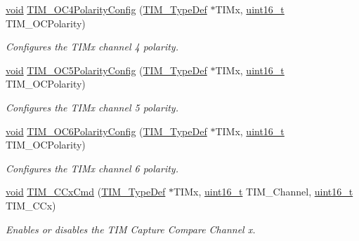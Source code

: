 \begin{DoxyCompactItemize}
\hyperlink{group___n_a_m_e_ga18028b8badbf1ea7e704ccac3c488e82}{void} \hyperlink{group___t_i_m___group2_gad678410f7c7244f83daad93ce9d1056e}{T\-I\-M\-\_\-\-O\-C4\-Polarity\-Config} (\hyperlink{struct_t_i_m___type_def}{T\-I\-M\-\_\-\-Type\-Def} $\ast$T\-I\-Mx, \hyperlink{stdint_8h_a273cf69d639a59973b6019625df33e30}{uint16\-\_\-t} T\-I\-M\-\_\-\-O\-C\-Polarity)
\begin{DoxyCompactList}\small\item\em Configures the T\-I\-Mx channel 4 polarity. \end{DoxyCompactList}\item 
\hyperlink{group___n_a_m_e_ga18028b8badbf1ea7e704ccac3c488e82}{void} \hyperlink{group___t_i_m___group2_ga9892494ca12fffef20b2e95970d7ef66}{T\-I\-M\-\_\-\-O\-C5\-Polarity\-Config} (\hyperlink{struct_t_i_m___type_def}{T\-I\-M\-\_\-\-Type\-Def} $\ast$T\-I\-Mx, \hyperlink{stdint_8h_a273cf69d639a59973b6019625df33e30}{uint16\-\_\-t} T\-I\-M\-\_\-\-O\-C\-Polarity)
\begin{DoxyCompactList}\small\item\em Configures the T\-I\-Mx channel 5 polarity. \end{DoxyCompactList}\item 
\hyperlink{group___n_a_m_e_ga18028b8badbf1ea7e704ccac3c488e82}{void} \hyperlink{group___t_i_m___group2_ga9f1dda56b1fb8f7ac17b9a7f58d0232d}{T\-I\-M\-\_\-\-O\-C6\-Polarity\-Config} (\hyperlink{struct_t_i_m___type_def}{T\-I\-M\-\_\-\-Type\-Def} $\ast$T\-I\-Mx, \hyperlink{stdint_8h_a273cf69d639a59973b6019625df33e30}{uint16\-\_\-t} T\-I\-M\-\_\-\-O\-C\-Polarity)
\begin{DoxyCompactList}\small\item\em Configures the T\-I\-Mx channel 6 polarity. \end{DoxyCompactList}\item 
\hyperlink{group___n_a_m_e_ga18028b8badbf1ea7e704ccac3c488e82}{void} \hyperlink{group___t_i_m___group2_ga3ecc4647d9ede261beb5e0535cf29ebb}{T\-I\-M\-\_\-\-C\-Cx\-Cmd} (\hyperlink{struct_t_i_m___type_def}{T\-I\-M\-\_\-\-Type\-Def} $\ast$T\-I\-Mx, \hyperlink{stdint_8h_a273cf69d639a59973b6019625df33e30}{uint16\-\_\-t} T\-I\-M\-\_\-\-Channel, \hyperlink{stdint_8h_a273cf69d639a59973b6019625df33e30}{uint16\-\_\-t} T\-I\-M\-\_\-\-C\-Cx)
\begin{DoxyCompactList}\small\item\em Enables or disables the T\-I\-M Capture Compare Channel x. \end{DoxyCompactList}\item 

\end{DoxyCompactItemize}
